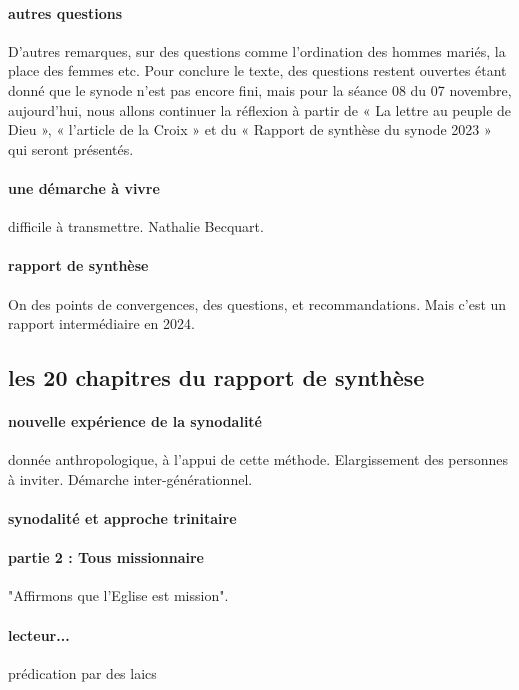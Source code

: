 \paragraph{autres questions}
D’autres remarques, sur des questions comme l’ordination des hommes mariés, la place des femmes etc.
Pour conclure le texte, des questions restent ouvertes étant donné que le synode n’est pas encore fini, mais pour la séance 08 du 07 novembre, aujourd’hui, nous allons continuer la réflexion à partir de « La lettre au peuple de Dieu », « l’article de la Croix » et du « Rapport de synthèse du synode 2023 » qui seront présentés.  



\paragraph{une démarche à vivre} difficile à transmettre.  Nathalie Becquart.


\paragraph{rapport de synthèse} On des points de convergences, des questions, et recommandations. Mais c'est un rapport intermédiaire en 2024.


\subsection{les 20 chapitres du rapport de synthèse}


\paragraph{nouvelle expérience de la synodalité} donnée anthropologique, à l'appui de cette méthode. Elargissement des personnes à inviter. Démarche inter-générationnel.

\paragraph{synodalité et approche trinitaire}


\paragraph{partie 2 : Tous missionnaire} "Affirmons que l'Eglise est mission".

\paragraph{lecteur...} prédication par des laics

